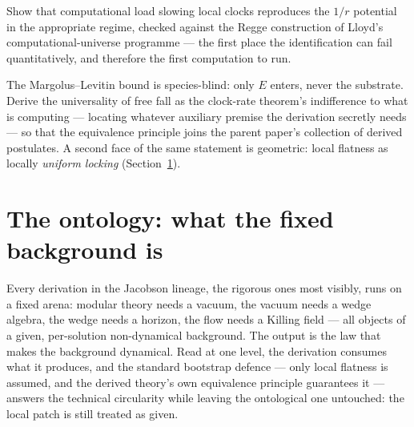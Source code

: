 \documentclass[11pt,a4paper]{article}
\begin{document}
\begin{openproblem}\label{op:p2-newton}
Show that computational load slowing local clocks reproduces the $1/r$ potential in the
appropriate regime, checked against the Regge construction of Lloyd's computational-universe
programme \autocite{lloyd2005quantum} --- the first place the identification can fail
quantitatively, and therefore the first computation to run.
\end{openproblem}

\begin{openproblem}\label{op:p2-equivalence}
The Margolus--Levitin bound is species-blind: only $E$ enters, never the substrate. Derive the
universality of free fall as the clock-rate theorem's indifference to what is computing ---
locating whatever auxiliary premise the derivation secretly needs --- so that the equivalence
principle joins the parent paper's collection of derived postulates. A second face of the same
statement is geometric: local flatness as locally \emph{uniform locking}
(Section~\ref{sec:p2-ontology}).
\end{openproblem}

\section{The ontology: what the fixed background is}
\label{sec:p2-ontology}


Every derivation in the Jacobson lineage, the rigorous ones most visibly, runs on a fixed arena:
modular theory needs a vacuum, the vacuum needs a wedge algebra, the wedge needs a horizon, the
flow needs a Killing field --- all objects of a given, per-solution non-dynamical background. The
output is the law that makes the background dynamical. Read at one level, the derivation consumes
what it produces, and the standard bootstrap defence --- only local flatness is assumed, and the
derived theory's own equivalence principle guarantees it --- answers the technical circularity
while leaving the ontological one untouched: the local patch is still treated as given.
\end{document}
